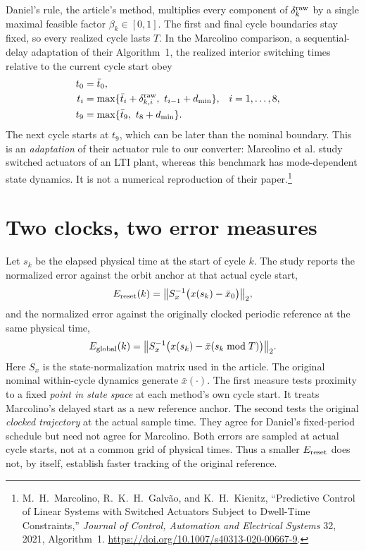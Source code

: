 \documentclass[11pt,a4paper]{article}
\begin{document}
Daniel's rule, the article's method, multiplies every component of $\delta^{\rm raw}_k$ by a single maximal feasible factor $\beta_k\in[0,1]$. The first and final cycle boundaries stay fixed, so every realized cycle lasts $T$. In the Marcolino comparison, a sequential-delay adaptation of their Algorithm~1, the realized interior switching times relative to the current cycle start obey
\begin{align}
 t_0&=\bar t_0,\\
 t_i&=\max\{\bar t_i+\delta^{\rm raw}_{k,i},\ t_{i-1}+d_{\min}\},
       &&i=1,\ldots,8,\\
 t_9&=\max\{\bar t_9,\ t_8+d_{\min}\}.
\end{align}
The next cycle starts at $t_9$, which can be later than the nominal boundary. This is an \emph{adaptation} of their actuator rule to our converter: Marcolino et al. study switched actuators of an LTI plant, whereas this benchmark has mode-dependent state dynamics. It is not a numerical reproduction of their paper.\footnote{M.~H.~Marcolino, R.~K.~H.~Galv\~ao, and K.~H.~Kienitz, ``Predictive Control of Linear Systems with Switched Actuators Subject to Dwell-Time Constraints,'' \emph{Journal of Control, Automation and Electrical Systems} 32, 2021, Algorithm~1. \url{https://doi.org/10.1007/s40313-020-00667-9}.}

\section{Two clocks, two error measures}

Let $s_k$ be the elapsed physical time at the start of cycle $k$. The study reports the normalized error against the orbit anchor at that actual cycle start,
\begin{equation}
 E_{\rm reset}(k)=\bigl\|S_x^{-1}\bigl(x(s_k)-\bar x_0\bigr)\bigr\|_2,
\end{equation}
and the normalized error against the originally clocked periodic reference at the same physical time,
\begin{equation}
 E_{\rm global}(k)=\bigl\|S_x^{-1}\bigl(x(s_k)-\bar x(s_k\bmod T)\bigr)\bigr\|_2.
\end{equation}
Here $S_x$ is the state-normalization matrix used in the article. The original nominal within-cycle dynamics generate $\bar x(\cdot)$. The first measure tests proximity to a fixed \emph{point in state space} at each method's own cycle start. It treats Marcolino's delayed start as a new reference anchor. The second tests the original \emph{clocked trajectory} at the actual sample time. They agree for Daniel's fixed-period schedule but need not agree for Marcolino. Both errors are sampled at actual cycle starts, not at a common grid of physical times. Thus a smaller $E_{\rm reset}$ does not, by itself, establish faster tracking of the original reference.
\end{document}
